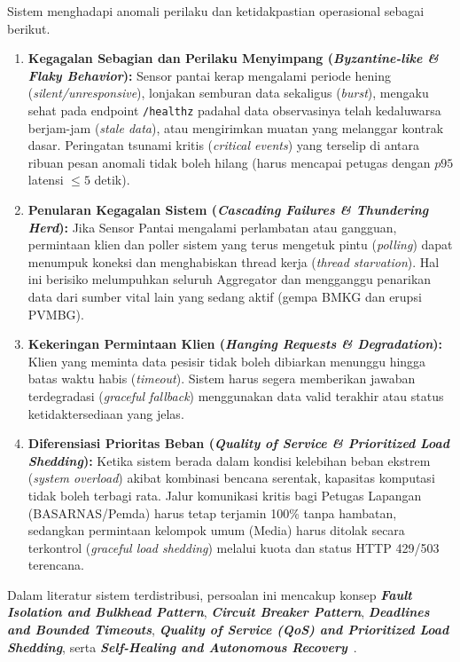 \noindent Sistem menghadapi anomali perilaku dan ketidakpastian operasional sebagai berikut.
\begin{enumerate}
    \item \textbf{Kegagalan Sebagian dan Perilaku Menyimpang (\textit{Byzantine-like \& Flaky Behavior}):} Sensor pantai kerap mengalami periode hening (\textit{silent/unresponsive}), lonjakan semburan data sekaligus (\textit{burst}), mengaku sehat pada endpoint \texttt{/healthz} padahal data observasinya telah kedaluwarsa berjam-jam (\textit{stale data}), atau mengirimkan muatan yang melanggar kontrak dasar. Peringatan tsunami kritis (\textit{critical events}) yang terselip di antara ribuan pesan anomali tidak boleh hilang (harus mencapai petugas dengan $p95$ latensi $\le 5$ detik).
    \item \textbf{Penularan Kegagalan Sistem (\textit{Cascading Failures \& Thundering Herd}):} Jika Sensor Pantai mengalami perlambatan atau gangguan, permintaan klien dan poller sistem yang terus mengetuk pintu (\textit{polling}) dapat menumpuk koneksi dan menghabiskan thread kerja (\textit{thread starvation}). Hal ini berisiko melumpuhkan seluruh Aggregator dan mengganggu penarikan data dari sumber vital lain yang sedang aktif (gempa BMKG dan erupsi PVMBG).
    \item \textbf{Kekeringan Permintaan Klien (\textit{Hanging Requests \& Degradation}):} Klien yang meminta data pesisir tidak boleh dibiarkan menunggu hingga batas waktu habis (\textit{timeout}). Sistem harus segera memberikan jawaban terdegradasi (\textit{graceful fallback}) menggunakan data valid terakhir atau status ketidaktersediaan yang jelas.
    \item \textbf{Diferensiasi Prioritas Beban (\textit{Quality of Service \& Prioritized Load Shedding}):} Ketika sistem berada dalam kondisi kelebihan beban ekstrem (\textit{system overload}) akibat kombinasi bencana serentak, kapasitas komputasi tidak boleh terbagi rata. Jalur komunikasi kritis bagi Petugas Lapangan (BASARNAS/Pemda) harus tetap terjamin 100\% tanpa hambatan, sedangkan permintaan kelompok umum (Media) harus ditolak secara terkontrol (\textit{graceful load shedding}) melalui kuota dan status HTTP 429/503 terencana.
\end{enumerate}

\vspace{1em}

\noindent Dalam literatur sistem terdistribusi, persoalan ini mencakup konsep \textbf{\textit{Fault Isolation and Bulkhead Pattern}}, \textbf{\textit{Circuit Breaker Pattern}}, \textbf{\textit{Deadlines and Bounded Timeouts}}, \textbf{\textit{Quality of Service (QoS) and Prioritized Load Shedding}}, serta \textbf{\textit{Self-Healing and Autonomous Recovery}}~\cite{nygard2018release,beyer2016sre}.

